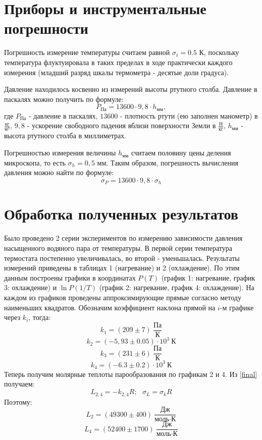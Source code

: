 \documentclass[15pt,a5paper,reqno]{article}
\begin{document}
\section{Приборы и инструментальные погрешности}

    Погрешность измерение температуры считаем равной $\sigma_t = 0.5\text{ К}$, поскольку температура флуктуировала в таких пределах в ходе практически каждого измерения (младший разряд шкалы термометра - десятые доли градуса).
    
    Давление находилось косвенно из измерений высоты ртутного столба. Давление в паскалях можно получить по формуле:
    \[P_{\text{Па}} = 13600 \cdot 9,8 \cdot h_{\text{мм}},\]
    где $P_{\text{Па}}$ - давление в паскалях, $13600$ - плотность ртути (ею заполнен манометр) в $\frac{\text{кг}}{\text{м}^3}$, $9,8$ - ускорение свободного падения вблизи поверхности Земли в $\frac{\text{Н}}{\text{кг}}$, $h_{\text{мм}}$ - высота ртутного столба в миллиметрах.
    
    Погрешностью измерения величины $h_{\text{мм}}$ считаем половину цены деления микроскопа, то есть $\sigma_{h} = 0,5\text{ мм}$. Таким образом, погрешность вычисления давления можно найти по формуле:
    \[\sigma_{P} = 13600 \cdot 9,8 \cdot \sigma_{h}\]
    
\section{Обработка полученных результатов}

    Было проведено 2 серии экспериментов по измерению зависимости давления насыщенного водяного пара от температуры. В первой серии температура термостата постепенно увеличивалась, во второй - уменьшалась. Результаты измерений приведены в таблицах 1 (нагревание) и 2 (охлаждение). По этим данным построены графики в координатах $P(T)$ (график 1: нагревание, график 3: охлаждение) и $\ln{P}(1/T)$ (график 2: нагревание, график 4: охлаждение). На каждом из графиков проведены аппроксимирующие прямые согласно методу наименьших квадратов. Обозначим коэффициент наклона прямой на $i$-м графике через $k_i$, тогда:
    \[k_1 = (209 \pm 7)\ \frac{\text{Па}}{\text{К}}\]
    \[k_2 = (-5,93 \pm 0.05)\cdot 10^3\ \text{К}\]
    \[k_3 = (231 \pm 6)\ \frac{\text{Па}}{\text{К}}\]
    \[k_4 = (-6.3 \pm 0.2)\cdot 10^3\ \text{К}\]
    Теперь получим молярные теплоты парообразования по графикам 2 и 4. Из \eqref{final} получаем:
    \[L_{2,4} = -k_{2,4}R;\ \ \ \sigma_L = \sigma_k R\]
    Поэтому:
    \[L_2 = (49300 \pm 400)\ \frac{\text{Дж}}{\text{моль}\cdot\text{К}}\]
    \[L_4 = (52400 \pm 1700)\ \frac{\text{Дж}}{\text{моль}\cdot\text{К}}\]
    
\end{document}
